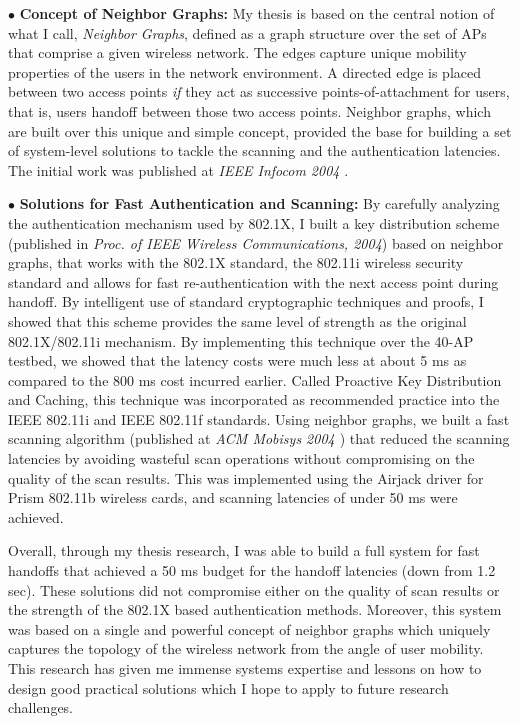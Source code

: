 \documentclass[11pt,letterpaper]{article}
\begin{document}
$\bullet$ {\bf Concept of Neighbor Graphs:} My thesis is based on the central notion of what I call, {\it
Neighbor Graphs}, defined as a graph structure over the set of APs that comprise a given wireless
network. The edges capture unique mobility properties of the users in the network environment. A directed edge is placed
between two access points {\it if} they act as successive points-of-attachment for users, that is, users handoff between
those two access points. Neighbor graphs, which are built over this unique and simple concept, provided the base for
building a set of system-level solutions to tackle the scanning and the authentication latencies. The initial work was
published at {\it IEEE Infocom 2004} \cite{mishra2004}.

$\bullet$  {\bf Solutions for Fast Authentication and Scanning:} By carefully analyzing the authentication mechanism
used by 802.1X, I built a key distribution scheme (published in {\it Proc. of IEEE Wireless Communications, 2004}) based
on neighbor graphs, that works with the 802.1X standard, the 802.11i wireless security standard and allows for fast
re-authentication with the next access point during handoff. By intelligent use of standard cryptographic techniques and
proofs, I showed that this scheme provides the same level of strength as the original 802.1X/802.11i mechanism. By
implementing this technique over the 40-AP testbed, we showed that the latency costs were much less at about 5 ms as
compared to the 800 ms cost incurred earlier. Called Proactive Key Distribution and Caching, this technique was
incorporated as recommended practice into the IEEE 802.11i and IEEE 802.11f standards.  Using neighbor graphs, we built
a fast scanning algorithm (published at {\it ACM Mobisys 2004 \cite{shin2004}}) that reduced the scanning latencies by
avoiding wasteful scan operations without compromising on the quality of the scan results. This was implemented using
the Airjack driver for Prism  802.11b wireless cards, and scanning latencies of under 50 ms were achieved. 

Overall, through my thesis research, I was able to build a full system for fast handoffs that achieved a 50 ms budget
for the handoff latencies (down from 1.2 sec). These solutions did not compromise either on the quality of scan results
or the strength of the 802.1X based authentication methods. Moreover, this system was based on a single and powerful
concept of neighbor graphs which uniquely captures the topology of the wireless network from the angle of user mobility.
This research has given me immense systems expertise and lessons on how to design good practical solutions which I hope
to apply to future research challenges.
\end{document}
